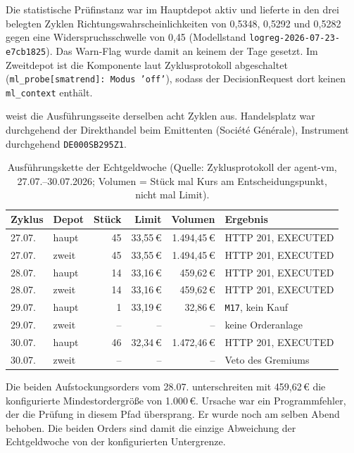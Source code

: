 Die statistische Prüfinstanz war im Hauptdepot aktiv und lieferte in den drei
belegten Zyklen Richtungswahrscheinlichkeiten von 0{,}5348, 0{,}5292 und 0{,}5282 gegen
eine Widerspruchsschwelle von 0{,}45 (Modellstand
\texttt{logreg-2026-07-23-e7cb1825}). Das Warn-Flag wurde damit an keinem der Tage
gesetzt. Im Zweitdepot ist die Komponente laut Zyklusprotokoll abgeschaltet
(\texttt{ml\_probe[smatrend]: Modus 'off'}), sodass der DecisionRequest dort
keinen \texttt{ml\_context} enthält.

 weist die Ausführungsseite derselben acht
Zyklen aus. Handelsplatz war durchgehend der Direkthandel beim Emittenten
(Société Générale), Instrument durchgehend \texttt{DE000SB295Z1}.

\begin{table}[htbp]
  \centering
  \footnotesize
  \caption[Ausführungskette der Echtgeldwoche]{%
    Ausführungskette der Echtgeldwoche (Quelle: Zyklusprotokoll der agent-vm,
    27.07.--30.07.2026; Volumen = Stück mal Kurs am Entscheidungspunkt, nicht mal
    Limit).\quelleeigen}
  \label{tab:anhang-echtgeldwoche-orders}
  \begin{tabular}{l l r r r l}
    \toprule
    Zyklus & Depot & Stück & Limit & Volumen & Ergebnis \\
    \midrule
    27.07. & haupt & 45 & 33{,}55\,€ & 1.494{,}45\,€ & HTTP 201, EXECUTED \\
    27.07. & zweit & 45 & 33{,}55\,€ & 1.494{,}45\,€ & HTTP 201, EXECUTED \\
    28.07. & haupt & 14 & 33{,}16\,€ &   459{,}62\,€ & HTTP 201, EXECUTED \\
    28.07. & zweit & 14 & 33{,}16\,€ &   459{,}62\,€ & HTTP 201, EXECUTED \\
    29.07. & haupt &  1 & 33{,}19\,€ &    32{,}86\,€ & \texttt{M17}, kein Kauf \\
    29.07. & zweit & -- & --         & --            & keine Orderanlage \\
    30.07. & haupt & 46 & 32{,}34\,€ & 1.472{,}46\,€ & HTTP 201, EXECUTED \\
    30.07. & zweit & -- & --         & --            & Veto des Gremiums \\
    \bottomrule
  \end{tabular}
\end{table}

Die beiden Aufstockungsorders vom 28.07. unterschreiten mit 459{,}62\,€ die
konfigurierte Mindestordergröße von 1.000\,€. Ursache war ein Programmfehler, der
die Prüfung in diesem Pfad übersprang. Er wurde noch am selben Abend behoben. Die
beiden Orders sind damit die einzige Abweichung der Echtgeldwoche von der
konfigurierten Untergrenze.

